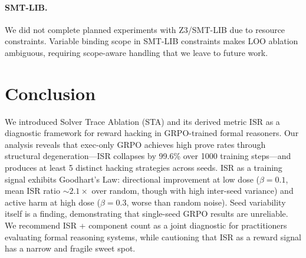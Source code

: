 \documentclass[11pt,a4paper]{article}
\begin{document}
\paragraph{SMT-LIB.}
We did not complete planned experiments with Z3/SMT-LIB due to resource constraints.
Variable binding scope in SMT-LIB constraints makes LOO ablation ambiguous, requiring scope-aware handling that we leave to future work.

\section{Conclusion}

We introduced Solver Trace Ablation (STA) and its derived metric ISR as a diagnostic framework for reward hacking in GRPO-trained formal reasoners.
Our analysis reveals that exec-only GRPO achieves high prove rates through structural degeneration---ISR collapses by 99.6\% over 1000 training steps---and produces at least 5 distinct hacking strategies across seeds.
ISR as a training signal exhibits Goodhart's Law: directional improvement at low dose ($\beta{=}0.1$, mean ISR ratio ${\sim}2.1\times$ over random, though with high inter-seed variance) and active harm at high dose ($\beta{=}0.3$, worse than random noise).
Seed variability itself is a finding, demonstrating that single-seed GRPO results are unreliable.
We recommend ISR + component count as a joint diagnostic for practitioners evaluating formal reasoning systems, while cautioning that ISR as a reward signal has a narrow and fragile sweet spot.
\end{document}
